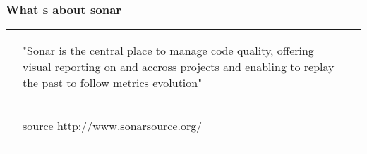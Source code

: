 \subsubsection{What s about sonar}
\begin{frame}[fragile]{\subsubsecname}
  \begin{tabular}{p{.1cm} p{8cm} p{.1cm}}
    & \begin{center} "Sonar is the central place to manage code quality, offering visual reporting on and accross projects and enabling to replay the past to follow metrics evolution" \end{center} & \\
    & \begin{center} source http://www.sonarsource.org/ \end{center} & \\
  \end{tabular}
\end{frame}
